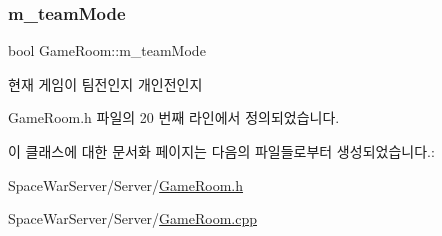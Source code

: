 \subsubsection{\texorpdfstring{m\+\_\+team\+Mode}{m\_teamMode}}
{\footnotesize\ttfamily bool Game\+Room\+::m\+\_\+team\+Mode\hspace{0.3cm}{\ttfamily [private]}}



현재 게임이 팀전인지 개인전인지 



Game\+Room.\+h 파일의 20 번째 라인에서 정의되었습니다.



이 클래스에 대한 문서화 페이지는 다음의 파일들로부터 생성되었습니다.\+:\begin{DoxyCompactItemize}
\item 
Space\+War\+Server/\+Server/\hyperlink{_game_room_8h}{Game\+Room.\+h}\item 
Space\+War\+Server/\+Server/\hyperlink{_game_room_8cpp}{Game\+Room.\+cpp}\end{DoxyCompactItemize}
